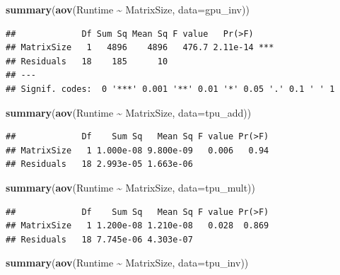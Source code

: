 \documentclass[
]{article}
\newenvironment{Shaded}{\begin{snugshade}}{\end{snugshade}}
\newcommand{\DataTypeTok}[1]{\textcolor[rgb]{0.13,0.29,0.53}{#1}}
\newcommand{\KeywordTok}[1]{\textcolor[rgb]{0.13,0.29,0.53}{\textbf{#1}}}
\newcommand{\NormalTok}[1]{#1}
\newcommand{\OperatorTok}[1]{\textcolor[rgb]{0.81,0.36,0.00}{\textbf{#1}}}
\newcommand{\StringTok}[1]{\textcolor[rgb]{0.31,0.60,0.02}{#1}}
\begin{document}
\begin{Shaded}
\begin{Highlighting}[]
\KeywordTok{summary}\NormalTok{(}\KeywordTok{aov}\NormalTok{(Runtime }\OperatorTok{\textasciitilde{}}\StringTok{ }\NormalTok{MatrixSize, }\DataTypeTok{data=}\NormalTok{gpu\_inv))}
\end{Highlighting}
\end{Shaded}

\begin{verbatim}
##             Df Sum Sq Mean Sq F value   Pr(>F)    
## MatrixSize   1   4896    4896   476.7 2.11e-14 ***
## Residuals   18    185      10                     
## ---
## Signif. codes:  0 '***' 0.001 '**' 0.01 '*' 0.05 '.' 0.1 ' ' 1
\end{verbatim}

\begin{Shaded}
\begin{Highlighting}[]
\KeywordTok{summary}\NormalTok{(}\KeywordTok{aov}\NormalTok{(Runtime }\OperatorTok{\textasciitilde{}}\StringTok{ }\NormalTok{MatrixSize, }\DataTypeTok{data=}\NormalTok{tpu\_add))}
\end{Highlighting}
\end{Shaded}

\begin{verbatim}
##             Df    Sum Sq   Mean Sq F value Pr(>F)
## MatrixSize   1 1.000e-08 9.800e-09   0.006   0.94
## Residuals   18 2.993e-05 1.663e-06
\end{verbatim}

\begin{Shaded}
\begin{Highlighting}[]
\KeywordTok{summary}\NormalTok{(}\KeywordTok{aov}\NormalTok{(Runtime }\OperatorTok{\textasciitilde{}}\StringTok{ }\NormalTok{MatrixSize, }\DataTypeTok{data=}\NormalTok{tpu\_mult))}
\end{Highlighting}
\end{Shaded}

\begin{verbatim}
##             Df    Sum Sq   Mean Sq F value Pr(>F)
## MatrixSize   1 1.200e-08 1.210e-08   0.028  0.869
## Residuals   18 7.745e-06 4.303e-07
\end{verbatim}

\begin{Shaded}
\begin{Highlighting}[]
\KeywordTok{summary}\NormalTok{(}\KeywordTok{aov}\NormalTok{(Runtime }\OperatorTok{\textasciitilde{}}\StringTok{ }\NormalTok{MatrixSize, }\DataTypeTok{data=}\NormalTok{tpu\_inv))}
\end{Highlighting}
\end{Shaded}
\end{document}
